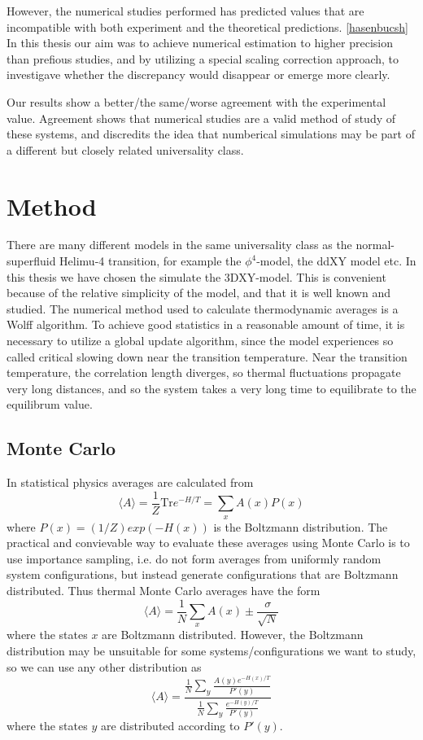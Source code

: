 \documentclass[a4paper]{article}
\newcommand{\trm}[1]{\textrm{#1}}
\begin{document}
However, the numerical studies performed has predicted values that are incompatible with both experiment and the theoretical predictions. \ref{hasenbucsh} 
In this thesis our aim was to achieve numerical estimation to higher precision than prefious studies, and by utilizing a special scaling correction approach, to investigave whether the discrepancy would disappear or emerge more clearly. 

Our results show a better/the same/worse agreement with the experimental value. Agreement shows that numerical studies are a valid method of study of these systems, and discredits the idea that numberical simulations may be part of a different but closely related universality class.

\section{Method}
There are many different models in the same universality class as the normal-superfluid Helimu-4 transition, for example the $\phi^4$-model, the ddXY model etc.
In this thesis we have chosen the simulate the 3DXY-model. This is convenient because of the relative simplicity of the model, and that it is well known and studied.
The numerical method used to calculate thermodynamic averages is a Wolff algorithm.
To achieve good statistics in a reasonable amount of time, it is necessary to utilize a global update algorithm, since the model experiences so called critical slowing down near the transition temperature. 
Near the transition temperature, the correlation length diverges, so thermal fluctuations propagate very long distances, and so the system takes a very long time to equilibrate to the equilibrum value.
\subsection{Monte Carlo}
In statistical physics averages are calculated from 
\begin{equation}
  \langle A\rangle = \frac{1}{Z}\trm{Tr} e^{-H/T} = \sum_x A(x) P(x)
\end{equation}
where  $P(x) = (1/Z)exp(-H(x))$ is the Boltzmann distribution.
The practical and convievable way to evaluate these averages using Monte Carlo is to use importance sampling, i.e. do not form averages from uniformly random system configurations, but instead generate configurations that are Boltzmann distributed.   
Thus thermal Monte Carlo averages have the form 
\begin{equation}
  \langle A \rangle = \frac{1}{N} \sum_x A(x) \pm \frac{\sigma	}{\sqrt N}
\end{equation}
where the states $x$ are Boltzmann distributed.
However, the Boltzmann distribution may be unsuitable for some systems/configurations we want to study, so we can use any other distribution as 
\begin{equation}
  \langle A \rangle = \frac{\frac{1}{N}\sum_y \frac{A(y) e^{-H(x)/T}}{P'(y)}}{\frac{1}{N}\sum_y \frac{e^{-H(y)/T}}{P'(y)}}  
\end{equation}
 where the states $y$ are distributed according to $P'(y)$.
\end{document}
